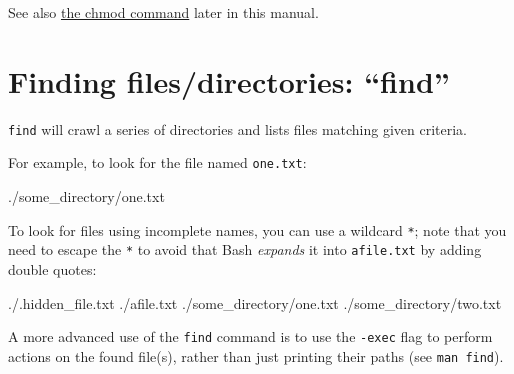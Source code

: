 See also \hyperref[sec:chmod]{the chmod command} later in this manual.

\section{Finding files/directories: ``find''}

\verb|find| will crawl a series of directories and lists files matching given criteria.

For example, to look for the file named \verb|one.txt|:

\begin{prompt}
./some_directory/one.txt
\end{prompt}

To look for files using incomplete names, you can use a wildcard \verb|*|; note
that you need to escape the \verb|*| to avoid that Bash \emph{expands} it into
\verb|afile.txt| by adding double quotes:

\begin{prompt}
./.hidden_file.txt
./afile.txt
./some_directory/one.txt
./some_directory/two.txt
\end{prompt}

A more advanced use of the \verb|find| command is to use the \verb|-exec| flag
to perform actions on the found file(s), rather than just printing their paths (see \verb|man find|).
